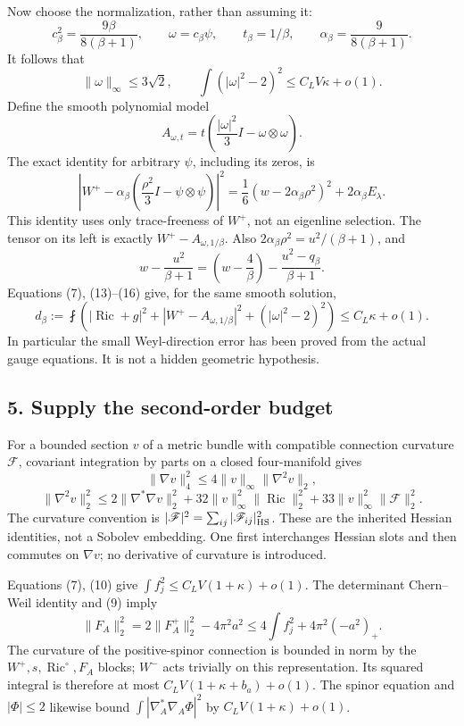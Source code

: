 \documentclass[
  11pt,
]{article}
\begin{document}
Now choose the normalization, rather than assuming it: \[
c_\beta^2=\frac{9\beta}{8(\beta+1)},\qquad
\omega=c_\beta\psi,\qquad t_\beta=1/\beta,\qquad
\alpha_\beta=\frac9{8(\beta+1)}.
\] It follows that \[
\|\omega\|_\infty\le3\sqrt2,\qquad
\int(|\omega|^2-2)^2\le C_L V\kappa+o(1).
\tag{15}
\] Define the smooth polynomial model \[
A_{\omega,t}=t\left(\frac{|\omega|^2}{3}I-\omega\otimes\omega\right).
\] The exact identity for arbitrary \(\psi\), including its zeros, is \[
\left|W^+-\alpha_\beta
       \left(\frac{\rho^2}{3}I-\psi\otimes\psi\right)\right|^2
=\frac16(w-2\alpha_\beta\rho^2)^2
+2\alpha_\beta E_\lambda.
\tag{16}
\] This identity uses only trace-freeness of \(W^+\), not an eigenline
selection. The tensor on its left is exactly \(W^+-A_{\omega,1/\beta}\).
Also \(2\alpha_\beta\rho^2=u^2/(\beta+1)\), and \[
w-\frac{u^2}{\beta+1}
=\left(w-\frac4\beta\right)
-\frac{u^2-q_\beta}{\beta+1}.
\] Equations (7), (13)--(16) give, for the same smooth solution, \[
d_\beta:=\fint\left(
 |\operatorname{Ric}+g|^2+|W^+-A_{\omega,1/\beta}|^2
+(|\omega|^2-2)^2\right)
\le C_L\kappa+o(1).
\tag{17}
\] In particular the small Weyl-direction error has been proved from the
actual gauge equations. It is not a hidden geometric hypothesis.

\hypertarget{supply-the-second-order-budget}{%
\subsection{5. Supply the second-order
budget}\label{supply-the-second-order-budget}}

For a bounded section \(v\) of a metric bundle with compatible
connection curvature \(\mathscr F\), covariant integration by parts on a
closed four-manifold gives \[
\|\nabla v\|_4^2\le4\|v\|_\infty\|\nabla^2v\|_2,
\] \[
\|\nabla^2v\|_2^2
\le2\|\nabla^*\nabla v\|_2^2
+32\|v\|_\infty^2\|\operatorname{Ric}\|_2^2
+33\|v\|_\infty^2\|\mathscr F\|_2^2.
\tag{18}
\] The curvature convention is
\(|\mathscr F|^2=\sum_{ij} |\mathscr F_{ij}|_{\rm HS}^2\). These are the
inherited Hessian identities, not a Sobolev embedding. One first
interchanges Hessian slots and then commutes on \(\nabla v\); no
derivative of curvature is introduced.

Equations (7), (10) give \(\int f_j^2\le C_L V(1+\kappa)+o(1)\). The
determinant Chern--Weil identity and (9) imply \[
\|F_A\|_2^2=2\|F_A^+\|_2^2-4\pi^2a^2
\le4\int f_j^2+4\pi^2(-a^2)_+.
\] The curvature of the positive-spinor connection is bounded in norm by
the \(W^+,s,\operatorname{Ric}^{\circ},F_A\) blocks; \(W^-\) acts
trivially on this representation. Its squared integral is therefore at
most \(C_LV(1+\kappa+b_a)+o(1)\). The spinor equation and \(|\Phi|\le2\)
likewise bound \(\int|\nabla_A^*\nabla_A\Phi|^2\) by
\(C_LV(1+\kappa)+o(1)\).
\end{document}
